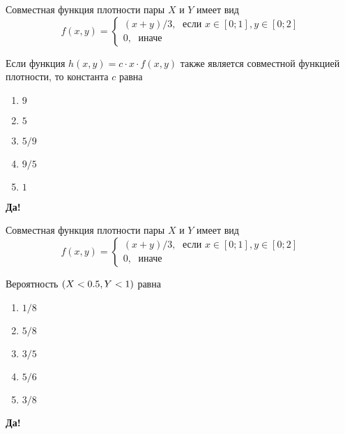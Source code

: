 \documentclass[t]{beamer}
\let\P\relax
\DeclareMathOperator{\P}{\mathbb{P}}
\begin{document}
 \begin{frame} \label{21-Yes} 
\begin{block}{21} 

Совместная функция плотности пары $X$ и $Y$ имеет вид
\[
f(x,y)=\begin{cases}
(x+y)/3, \; \text{ если } x\in[0;1], y\in [0;2] \\
0, \; \text{ иначе}
\end{cases}
\]

\vspace{0.5cm} 
 
Если функция $h(x,y)=c\cdot x\cdot f(x,y)$ также является совместной функцией плотности, то константа $c$ равна
 


 \end{block} 
\begin{enumerate} 
\item[] \hyperlink{21-No}{\beamergotobutton{} $9$}
\item[] \hyperlink{21-No}{\beamergotobutton{} $5$}
\item[] \hyperlink{21-No}{\beamergotobutton{} $5/9$}
\item[] \hyperlink{21-Yes}{\beamergotobutton{} $9/5$}
\item[] \hyperlink{21-No}{\beamergotobutton{} $1$}
\end{enumerate} 

 \textbf{Да!} 
 \hyperlink{22}{}\end{frame} 


 \begin{frame} \label{22-Yes} 
\begin{block}{22} 

Совместная функция плотности пары $X$ и $Y$ имеет вид
\[
f(x,y)=\begin{cases}
(x+y)/3, \; \text{ если } x\in[0;1], y\in [0;2] \\
0, \; \text{ иначе}
\end{cases}
\]

\vspace{0.5cm} 
 
 Вероятность $\P(X<0.5, Y<1)$ равна
 


 \end{block} 
\begin{enumerate} 
\item[] \hyperlink{22-Yes}{\beamergotobutton{} $1/8$}
\item[] \hyperlink{22-No}{\beamergotobutton{} $5/8$}
\item[] \hyperlink{22-No}{\beamergotobutton{} $3/5$}
\item[] \hyperlink{22-No}{\beamergotobutton{} $5/6$}
\item[] \hyperlink{22-No}{\beamergotobutton{} $3/8$
}
\end{enumerate} 

 \textbf{Да!} 
 \hyperlink{23}{}\end{frame} 
\end{document}
